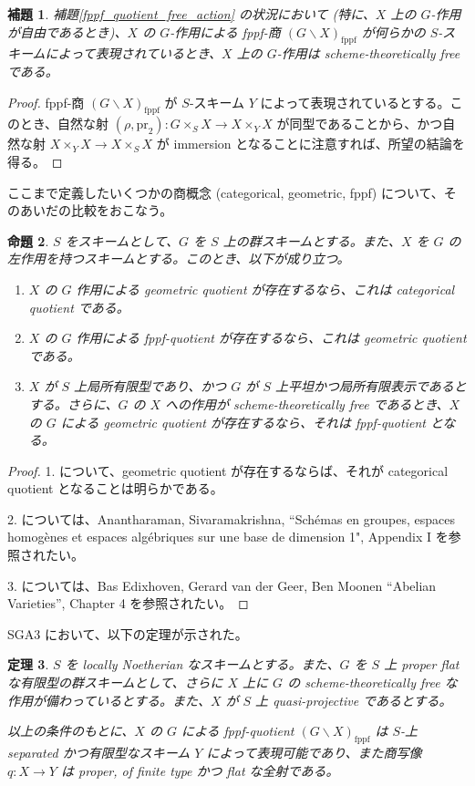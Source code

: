 \documentclass{jsarticle}
\newcommand{\lquot}{\backslash}
\newcommand{\fppflquot}[2]{(#1 \lquot#2)_\mathrm{fppf}}
\newcommand{\FLQ}[2]{\fppflquot{#1}{#2}}
\newtheorem{thm}{定理}
\newtheorem{prop}[thm]{命題}
\newtheorem{lem}[thm]{補題}
\begin{document}
\begin{lem}
  補題\ref{fppf_quotient_free_action} の状況において (特に、$X$ 上の $G$-作用が自由であるとき)、$X$ の $G$-作用による fppf-商 $\FLQ{G}{X}$ が何らかの $S$-スキームによって表現されているとき、$X$ 上の $G$-作用は scheme-theoretically free である。
\end{lem}
\begin{proof}
  fppf-商 $\FLQ{G}{X}$ が $S$-スキーム $Y$ によって表現されているとする。このとき、自然な射 $(\rho, \mathrm{pr}_2) \colon G \times_S X \to X \times_Y X$ が同型であることから、かつ自然な射 $X \times_Y X \to X \times_S X$ が immersion となることに注意すれば、所望の結論を得る。
\end{proof}

ここまで定義したいくつかの商概念 (categorical, geometric, fppf) について、そのあいだの比較をおこなう。

\begin{prop}
  $S$ をスキームとして、$G$ を $S$ 上の群スキームとする。また、$X$ を $G$ の左作用を持つスキームとする。このとき、以下が成り立つ。
  \begin{enumerate}
    \item $X$ の $G$ 作用による geometric quotient が存在するなら、これは categorical quotient である。
    \item $X$ の $G$ 作用による fppf-quotient が存在するなら、これは geometric quotient である。
    \item $X$ が $S$ 上局所有限型であり、かつ $G$ が $S$ 上平坦かつ局所有限表示であるとする。さらに、$G$ の $X$ への作用が scheme-theoretically free であるとき、$X$ の $G$ による geometric quotient が存在するなら、それは fppf-quotient となる。
  \end{enumerate}
\end{prop}
\begin{proof}
  1. について、geometric quotient が存在するならば、それが categorical quotient となることは明らかである。

  2. については、Anantharaman, Sivaramakrishna, ``Schémas en groupes, espaces homogènes et espaces algébriques sur une base de dimension 1", Appendix I を参照されたい。

  3. については、Bas Edixhoven, Gerard van der Geer, Ben Moonen ``Abelian Varieties'', Chapter 4 を参照されたい。
\end{proof}

SGA3 において、以下の定理が示された。

\begin{thm}
  $S$ を locally Noetherian なスキームとする。また、$G$ を $S$ 上 proper flat な有限型の群スキームとして、さらに $X$ 上に $G$ の scheme-theoretically free な作用が備わっているとする。また、$X$ が $S$ 上 quasi-projective であるとする。
  
  以上の条件のもとに、$X$ の $G$ による fppf-quotient $\FLQ{G}{X}$ は $S$-上 separated かつ有限型なスキーム $Y$ によって表現可能であり、また商写像 $q \colon X \to Y$ は proper, of finite type かつ flat な全射である。
\end{thm}
\end{document}
